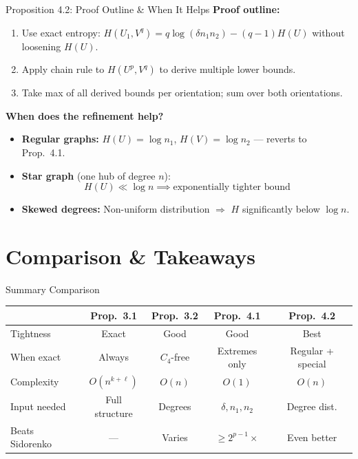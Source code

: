 \documentclass[aspectratio=169]{beamer}
\begin{document}
\begin{frame}{Proposition 4.2: Proof Outline \& When It Helps}
  \textbf{Proof outline:}
  \begin{enumerate}
    \item Use exact entropy: $H(U_1, V^q) = q\log(\delta n_1 n_2) - (q-1)H(U)$ without loosening $H(U)$.
    \item Apply chain rule to $H(U^p, V^q)$ to derive multiple lower bounds.
    \item Take max of all derived bounds per orientation; sum over both orientations.
  \end{enumerate}

  \textbf{When does the refinement help?}
  \begin{itemize}
    \item \textbf{Regular graphs:} $H(U) = \log n_1$, $H(V) = \log n_2$ --- reverts to Prop.\ 4.1.
    \item \textbf{Star graph} (one hub of degree $n$):
      \[
        H(U) \ll \log n \implies \text{exponentially tighter bound}
      \]
    \item \textbf{Skewed degrees:} Non-uniform distribution $\Rightarrow$ $H$ significantly below $\log n$.
  \end{itemize}
\end{frame}

\section{Comparison \& Takeaways}

\begin{frame}{Summary Comparison}
  \begin{center}
    \begin{tabular}{lcccc}
      \toprule
      & \textbf{Prop.\ 3.1} & \textbf{Prop.\ 3.2} & \textbf{Prop.\ 4.1} & \textbf{Prop.\ 4.2} \\
      \midrule
      Tightness     & Exact          & Good        & Good           & Best \\
      When exact    & Always         & $C_4$-free  & Extremes only  & Regular + special \\
      Complexity    & $O(n^{k+\ell})$& $O(n)$      & $O(1)$         & $O(n)$ \\
      Input needed  & Full structure & Degrees     & $\delta, n_1, n_2$ & Degree dist. \\
      Beats Sidorenko & ---          & Varies      & $\geq 2^{p-1}\times$ & Even better \\
      \bottomrule
    \end{tabular}
  \end{center}
\end{frame}
\end{document}
